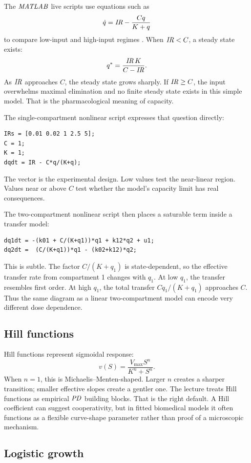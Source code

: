 \documentclass[a4paper]{article}
\newcommand{\PD}{\ensuremath{\pksym{PD}}}
\newcommand{\MATLAB}{\ensuremath{\pksym{MATLAB}}}
\newcommand{\code}[1]{\texttt{\detokenize{#1}}}
\newcommand{\Vmax}{V_{\max}}
\begin{document}
The \MATLAB{} live scripts use equations such as
\[
  \dot q=\pksym{IR}-\frac{Cq}{K+q}
\]
to compare low-input and high-input regimes \cite{bmeg671MatlabNonlinearStability2025}. When \(\pksym{IR}<C\), a steady state exists:
\[
  q^\ast=\frac{\pksym{IR}\,K}{C-\pksym{IR}}.
\]
As \(\pksym{IR}\) approaches \(C\), the steady state grows sharply. If \(\pksym{IR}\ge C\), the input overwhelms maximal elimination and no finite steady state exists in this simple model. That is the pharmacological meaning of capacity.

The single-compartment nonlinear script expresses that question directly:
\begin{verbatim}
IRs = [0.01 0.02 1 2.5 5];
C = 1;
K = 1;
dqdt = IR - C*q/(K+q);
\end{verbatim}
The vector \code{IRs} is the experimental design. Low values test the near-linear region. Values near or above \(C\) test whether the model's capacity limit has real consequences.

The two-compartment nonlinear script then places a saturable term inside a transfer model:
\begin{verbatim}
dq1dt = -(k01 + C/(K+q1))*q1 + k12*q2 + u1;
dq2dt =  (C/(K+q1))*q1 - (k02+k12)*q2;
\end{verbatim}
This is subtle. The factor \(C/(K+q_1)\) is state-dependent, so the effective transfer rate from compartment 1 changes with \(q_1\). At low \(q_1\), the transfer resembles first order. At high \(q_1\), the total transfer \(Cq_1/(K+q_1)\) approaches \(C\). Thus the same diagram as a linear two-compartment model can encode very different dose dependence.

\subsection{Hill functions}

Hill functions represent sigmoidal response:
\[
  v(S)=\frac{\Vmax S^n}{K^n+S^n}.
\]
When \(n=1\), this is Michaelis--Menten-shaped. Larger \(n\) creates a sharper transition; smaller effective slopes create a gentler one. The lecture treats Hill functions as empirical \PD{} building blocks. That is the right default. A Hill coefficient can suggest cooperativity, but in fitted biomedical models it often functions as a flexible curve-shape parameter rather than proof of a microscopic mechanism.

\subsection{Logistic growth}
\end{document}
